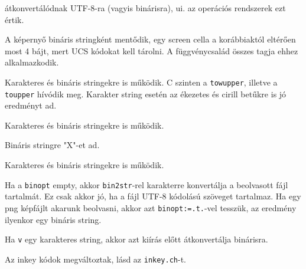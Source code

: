 \begin{description}
    átkonvertálódnak UTF-8-ra (vagyis  binárisra), 
    ui. az operációs rendszerek ezt értik.
\item[{\tt savescreen()}]
    A képernyő bináris stringként mentődik, egy screen
    cella a korábbiaktól eltérően most 4 bájt, mert UCS
    kódokat kell tárolni. A függvénycsalád összes tagja
    ehhez alkalmazkodik.
\item[{\tt upper(v)}]
    Karakteres és bináris stringekre is működik.
    C szinten a \verb!towupper!, illetve a \verb!toupper!
    hívódik meg. Karakter string esetén az ékezetes és cirill 
    betűkre is jó eredményt ad.
\item[{\tt val(x)}]
    Karakteres és bináris stringekre is működik.
\item[{\tt valtype(v)}]
    Bináris stringre "X"-et ad.
\item[{\tt like()}]
    Karakteres és bináris stringekre is működik.
\item[{\tt memoread(fspec [,binopt])}]
    Ha a \verb!binopt! empty, akkor \verb!bin2str!-rel
    karakterre konvertálja a beolvasott fájl tartalmát.
    Ez csak akkor jó, ha a fájl UTF-8 kódolású szöveget tartalmaz.
    Ha egy png képfájlt akarunk beolvasni, akkor azt 
    \verb!binopt:=.t.!-vel tesszük, az eredmény ilyenkor
    egy bináris string.
\item[{\tt memowrit(fspec,v)}]
    Ha \verb!v! egy karakteres string, akkor azt kiírás
    előtt átkonvertálja binárisra.
\item[{\tt inkey() }]
    Az inkey kódok megváltoztak, lásd az \verb!inkey.ch!-t.
\end{description}






